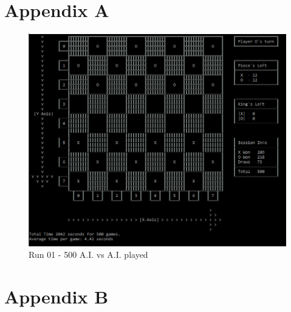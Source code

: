 \documentclass[10pt, a4paper]{article}
\begin{document}


   

\appendix
\newpage
\onecolumn
\section{Appendix A}

\begin{figure}[H]
	\centering	
	\includegraphics[scale=0.8]{RunOne500}
	\caption{Run 01 - 500 A.I. vs A.I. played}		
\end{figure}


\newpage
\section{Appendix B}
\end{document}
